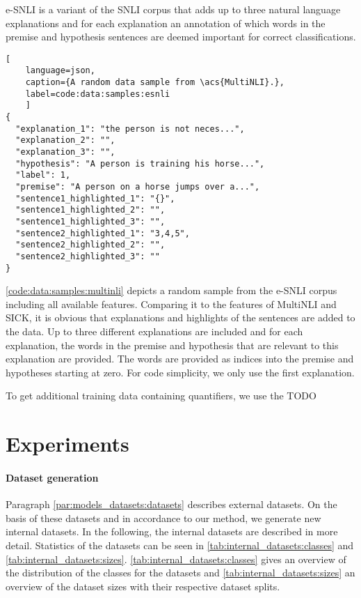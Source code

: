 \Acf{e-SNLI} \cite{esnli} is a variant of the \acs{SNLI} \cite{snli} corpus that adds up to three natural language explanations and for each explanation an annotation of which words in the premise and hypothesis sentences are deemed important for correct classifications.

\begin{lstlisting}[
    language=json,
    caption={A random data sample from \acs{MultiNLI}.},
    label=code:data:samples:esnli
    ]
{
  "explanation_1": "the person is not neces...",
  "explanation_2": "",
  "explanation_3": "",
  "hypothesis": "A person is training his horse...",
  "label": 1,
  "premise": "A person on a horse jumps over a...",
  "sentence1_highlighted_1": "{}",
  "sentence1_highlighted_2": "",
  "sentence1_highlighted_3": "",
  "sentence2_highlighted_1": "3,4,5",
  "sentence2_highlighted_2": "",
  "sentence2_highlighted_3": ""
}
\end{lstlisting}

\autoref{code:data:samples:multinli} depicts a random sample from the \acs{e-SNLI} corpus including all available features. Comparing it to the features of \acs{MultiNLI} and \acs{SICK}, it is obvious that explanations and highlights of the sentences are added to the data. Up to three different explanations are included and for each explanation, the words in the premise and hypothesis that are relevant to this explanation are provided. The words are provided as indices into the premise and hypotheses starting at zero. For code simplicity, we only use the first explanation.

To get additional training data containing quantifiers, we use the TODO

\section{Experiments}
\paragraph{Dataset generation}
Paragraph \ref{par:models_datasets:datasets} describes external datasets. On the basis of these datasets and in accordance to our method, we generate new internal datasets. In the following, the internal datasets are described in more detail. Statistics of the datasets can be seen in \autoref{tab:internal_datasets:classes} and \autoref{tab:internal_datasets:sizes}. \autoref{tab:internal_datasets:classes} gives an overview of the distribution of the classes for the datasets and \autoref{tab:internal_datasets:sizes} an overview of the dataset sizes with their respective dataset splits.

